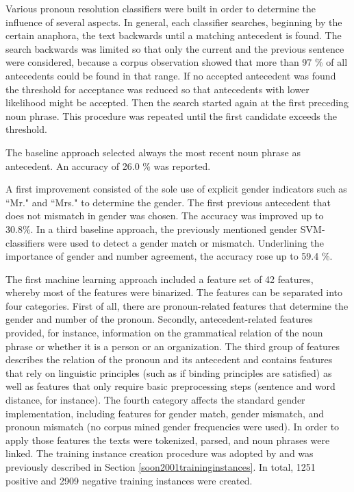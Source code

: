 Various pronoun resolution classifiers were built in order to determine the influence of several aspects. In general, each classifier searches, beginning by the certain anaphora, the text backwards until a matching antecedent is found. The search backwards was limited so that only the current and the previous sentence were considered, because a corpus observation showed that more than 97 \% of all antecedents could be found in that range. If no accepted antecedent was found the threshold for acceptance was reduced so that antecedents with lower likelihood might be accepted. Then the search started again at the first preceding noun phrase. This procedure was repeated until the first candidate exceeds the threshold. 

The baseline approach selected always the most recent noun phrase as antecedent. An accuracy of 26.0 \% was reported. 

A first improvement consisted of the sole use of explicit gender indicators such as ``Mr." and ``Mrs." to determine the gender. The first previous antecedent that does not mismatch in gender was chosen. The accuracy was improved up to 30.8\%. 
In a third baseline approach, the previously mentioned gender SVM-classifiers were used to detect a gender match or mismatch. Underlining the importance of gender and number agreement, the accuracy rose up to 59.4 \%.

The first machine learning approach included a feature set of 42 features, whereby most of the features were binarized. The features can be separated into four categories. First of all, there are pronoun-related features that determine the gender and number of the pronoun. Secondly, antecedent-related features provided, for instance, information on the grammatical relation of the noun phrase or whether it is a person or an organization. The third group of features describes the relation of the pronoun and its antecedent and contains features that rely on linguistic principles (such as if binding principles are satisfied) as well as features that only require basic preprocessing steps (sentence and word distance, for instance). The fourth category affects the standard gender implementation, including features for gender match, gender mismatch, and pronoun mismatch (no corpus mined gender frequencies were used). In order to apply those features the texts were tokenized, parsed, and noun phrases were linked. The training instance creation procedure was adopted by \cite{soon2001machine} and was previously described in Section \ref{soon2001traininginstances}. In total, 1251 positive and 2909 negative training instances were created. 

